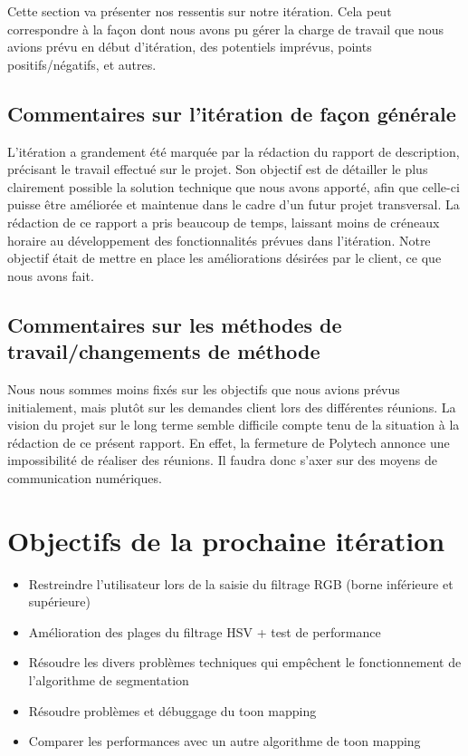 \documentclass[12pt,titlepage,french]{article}
\begin{document}
Cette section va présenter nos ressentis sur notre itération. Cela peut correspondre à la façon dont nous avons pu gérer la charge de travail que nous avions prévu en début d'itération, des potentiels imprévus, points positifs/négatifs, et autres.

\subsection{Commentaires sur l'itération de façon générale}

L'itération a grandement été marquée par la rédaction du rapport de description, précisant le travail effectué sur le projet. Son objectif est de détailler le plus clairement possible la solution technique que nous avons apporté, afin que celle-ci puisse être améliorée et maintenue dans le cadre d'un futur projet transversal.
La rédaction de ce rapport a pris beaucoup de temps, laissant moins de créneaux horaire au développement des fonctionnalités prévues dans l'itération.
Notre objectif était de mettre en place les améliorations désirées par le client, ce que nous avons fait.

\subsection{Commentaires sur les méthodes de travail/changements de méthode}

Nous nous sommes moins fixés sur les objectifs que nous avions prévus initialement, mais plutôt sur les demandes client lors des différentes réunions.
La vision du projet sur le long terme semble difficile compte tenu de la situation à la rédaction de ce présent rapport. En effet, la fermeture de Polytech annonce une impossibilité de réaliser des réunions.
Il faudra donc s'axer sur des moyens de communication numériques.
\section{Objectifs de la prochaine itération}

\begin{itemize}
    \item Restreindre l'utilisateur lors de la saisie du filtrage RGB (borne inférieure et supérieure)
    \item Amélioration des plages du filtrage HSV + test de performance
    \item Résoudre les divers problèmes techniques qui empêchent le fonctionnement de l'algorithme de segmentation
    \item Résoudre problèmes et débuggage du toon mapping
    \item Comparer les performances avec un autre algorithme de toon mapping
\end{itemize}
\end{document}
